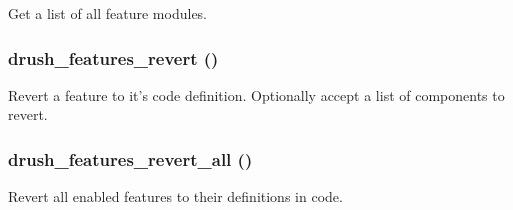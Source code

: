 \label{features_8drush_8inc_a65af07a0ebc9889a8bc4ae56b860d756}
Get a list of all feature modules. \hypertarget{features_8drush_8inc_aaac9159c4d7d5f228fa134accf950ef0}{
\subsubsection[{drush\_\-features\_\-revert}]{\setlength{\rightskip}{0pt plus 5cm}drush\_\-features\_\-revert ()}}
\label{features_8drush_8inc_aaac9159c4d7d5f228fa134accf950ef0}
Revert a feature to it's code definition. Optionally accept a list of components to revert. \hypertarget{features_8drush_8inc_ad34f00c0b0713a83ac44557a361e7b35}{
\subsubsection[{drush\_\-features\_\-revert\_\-all}]{\setlength{\rightskip}{0pt plus 5cm}drush\_\-features\_\-revert\_\-all ()}}
\label{features_8drush_8inc_ad34f00c0b0713a83ac44557a361e7b35}
Revert all enabled features to their definitions in code.


